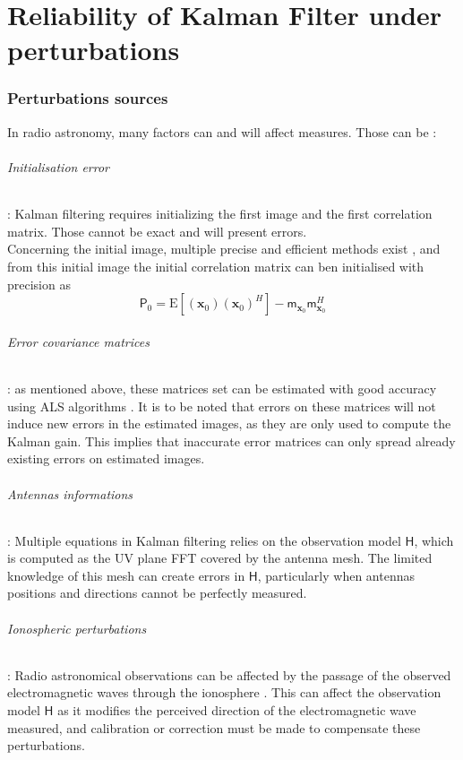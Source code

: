 \documentclass[titlepage]{article}
\newcommand{\moy}[1]{\boldsymbol{\mathsf{m}}_{#1}}
\newcommand{\autocorr}[1]{\expval{(#1)(#1)^H}}
\renewcommand{\expval}[1]{\text{E}\left[#1\right]}
\renewcommand{\H}{\boldsymbol{\mathsf{H}}}
\newcommand{\x}{\boldsymbol{x}}
\renewcommand{\P}{\boldsymbol{\mathsf{P}}}
\begin{document}
	\newpage
	\part{Reliability of Kalman Filter under perturbations}
	\section{Perturbations sources}
	
	In radio astronomy, many factors can and will affect measures. Those can be :
	\paragraph{Initialisation error} : Kalman filtering requires initializing the first image and the first correlation matrix. Those cannot be exact and will present errors. \\
	Concerning the initial image, multiple precise and efficient methods exist \cite{bible}, and from this initial image the initial correlation matrix can ben initialised\cite{intro_KF} with precision as 
	\begin{equation}\label{p0}
		\P_0 = \autocorr{\x_0} - \moy{\x_0}\moy{\x_0}^H
	\end{equation}
	
	\paragraph{Error covariance matrices} : as mentioned above, these matrices set can be estimated with good accuracy using ALS algorithms \cite{ALS}. It is to be noted that errors on these matrices will not induce new errors in the estimated images, as they are only used to compute the Kalman gain. This implies that inaccurate error matrices can only spread already existing errors on estimated images.
	
	\paragraph{Antennas informations} : Multiple equations in Kalman filtering relies on the observation model $\H$, which is computed as the UV plane FFT covered by the antenna mesh. The limited knowledge of this mesh can create errors in $\H$, particularly when antennas positions and directions cannot be perfectly measured.
	
	\paragraph{Ionospheric perturbations} : Radio astronomical observations can be affected by the passage of the observed electromagnetic waves through the ionosphere \cite{iono}. This can affect the observation model $\H$ as it modifies the perceived direction of the electromagnetic wave measured, and calibration or correction must be made to compensate these perturbations.
	
\end{document}
